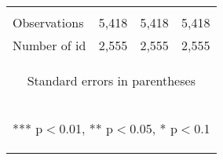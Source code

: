 \begin{center}
\begin{tabular}{lccc}
\vspace{4pt} & \begin{footnotesize}\end{footnotesize} & \begin{footnotesize}\end{footnotesize} & \begin{footnotesize}\end{footnotesize} \\
Observations & 5,418 & 5,418 & 5,418 \\
 Number of id & 2,555 & 2,555 & 2,555 \\ \hline
\multicolumn{4}{c}{\begin{footnotesize} Standard errors in parentheses\end{footnotesize}} \\
\multicolumn{4}{c}{\begin{footnotesize} *** p$<$0.01, ** p$<$0.05, * p$<$0.1\end{footnotesize}} \\
\end{tabular}
\end{center}
